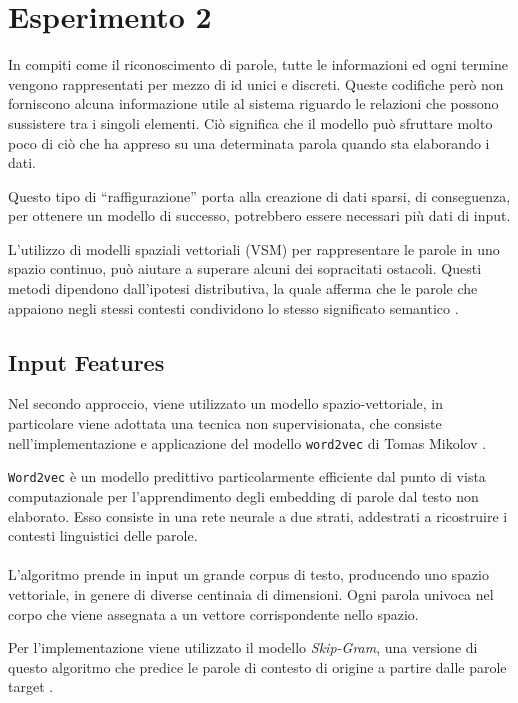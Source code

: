 \section{Esperimento 2}
\label{sec:es2}

In compiti come il riconoscimento di parole, tutte le informazioni ed ogni termine vengono rappresentati per mezzo di id unici e discreti.
Queste codifiche però non forniscono alcuna informazione utile al sistema riguardo le relazioni che possono sussistere tra i singoli elementi. Ciò significa che il modello può sfruttare molto poco di ciò che ha appreso su una determinata parola quando sta elaborando i dati. 

Questo tipo di ``raffigurazione'' porta alla creazione di dati sparsi, di conseguenza, per ottenere un modello di successo, potrebbero essere necessari più dati di input. 

L'utilizzo di modelli spaziali vettoriali (VSM) per rappresentare le parole in uno spazio continuo, può aiutare a superare alcuni dei sopracitati ostacoli.
Questi metodi dipendono dall'ipotesi distributiva, la quale afferma che le parole che appaiono negli stessi contesti condividono lo stesso significato semantico \cite{FIXME}. 

\subsection{Input Features}
\label{subsec:features2}

Nel secondo approccio, viene utilizzato un modello spazio-vettoriale, in particolare viene adottata una tecnica non supervisionata, che consiste nell'implementazione e applicazione del modello \texttt{word2vec} di Tomas Mikolov \cite{mikolov2013efficient}. 

\texttt{Word2vec} è un modello predittivo particolarmente efficiente dal punto di vista computazionale per l'apprendimento degli embedding di parole dal testo non elaborato. 
Esso consiste in una rete neurale a due strati, addestrati a ricostruire i contesti linguistici delle parole. 
\\
\\
L'algoritmo prende in input un grande corpus di testo, producendo uno spazio vettoriale, in genere di diverse centinaia di dimensioni. Ogni parola univoca nel corpo che viene assegnata a un vettore corrispondente nello spazio. 

Per l'implementazione viene utilizzato il modello \emph{Skip-Gram}, una versione di questo algoritmo che predice le parole di contesto di origine a partire dalle parole target \cite{FIXME}.

